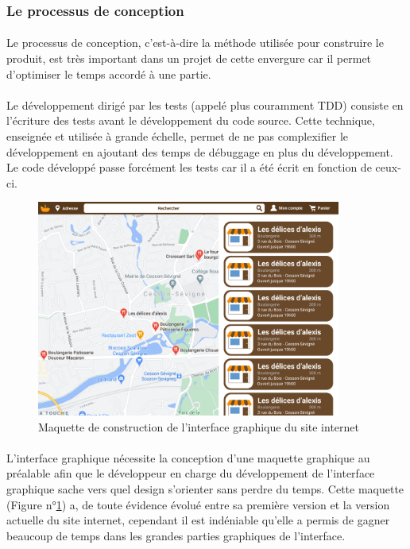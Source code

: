 \documentclass[a4paper, 12pt]{article}
\begin{document}
\subsubsection{Le processus de conception}
\paragraph{}Le processus de conception, c’est-à-dire la méthode utilisée pour construire le produit, est très important dans un projet de cette envergure car il permet d’optimiser le temps accordé à une partie.
\paragraph{}Le développement dirigé par les tests (appelé plus couramment TDD) consiste en l’écriture des tests avant le développement du code source. Cette technique, enseignée et utilisée à grande échelle, permet de ne pas complexifier le développement en ajoutant des temps de débuggage en plus du développement. Le code développé passe forcément les tests car il a été écrit en fonction de ceux-ci.

\begin{figure}[H]
	\begin{center}
		\includegraphics[width=10cm]{fig/maquette.png}
		\caption{Maquette de construction de l'interface graphique du site internet}
		\label{fig:maquette}
	\end{center}
\end{figure}

\paragraph{}L’interface graphique nécessite la conception d’une maquette graphique au préalable afin que le développeur en charge du développement de l’interface graphique sache vers quel design s’orienter sans perdre du temps. Cette maquette (Figure n°\ref{fig:maquette}) a, de toute évidence évolué entre sa première version et la version actuelle du site internet, cependant il est indéniable qu’elle a permis de gagner beaucoup de temps dans les grandes parties graphiques de l’interface.
\end{document}
